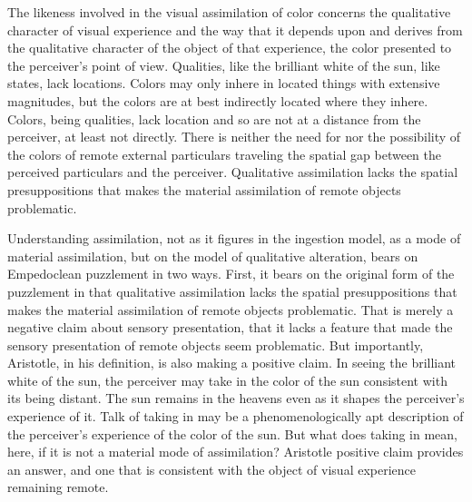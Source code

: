 The likeness involved in the visual assimilation of color concerns the qualitative character of visual experience and the way that it depends upon and derives from the qualitative character of the object of that experience, the color presented to the perceiver's point of view. Qualities, like the brilliant white of the sun, like states, lack locations. Colors may only inhere in located things with extensive magnitudes, but the colors are at best indirectly located where they inhere. Colors, being qualities, lack location and so are not at a distance from the perceiver, at least not directly. There is neither the need for nor the possibility of the colors of remote external particulars traveling the spatial gap between the perceived particulars and the perceiver. Qualitative assimilation lacks the spatial presuppositions that makes the material assimilation of remote objects problematic.

Understanding assimilation, not as it figures in the ingestion model, as a mode of material assimilation, but on the model of qualitative alteration, bears on Empedoclean puzzlement in two ways. First, it bears on the original form of the puzzlement in that qualitative assimilation lacks the spatial presuppositions that makes the material assimilation of remote objects problematic. That is merely a negative claim about sensory presentation, that it lacks a feature that made the sensory presentation of remote objects seem problematic. But importantly, Aristotle, in his definition, is also making a positive claim. In seeing the brilliant white of the sun, the perceiver may take in the color of the sun consistent with its being distant. The sun remains in the heavens even as it shapes the perceiver's experience of it. Talk of taking in may be a phenomenologically apt description of the perceiver's experience of the color of the sun. But what does taking in mean, here, if it is not a material mode of assimilation? Aristotle positive claim provides an answer, and one that is consistent with the object of visual experience remaining remote. 


